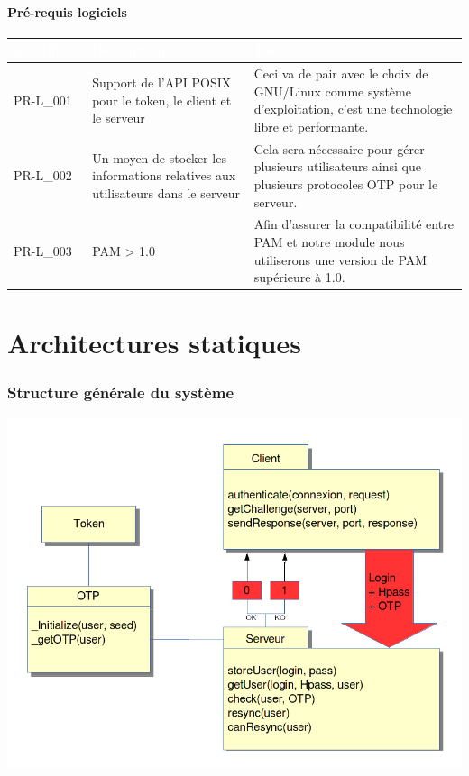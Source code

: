 \documentclass{"../../res/univ-projet"}
\begin{document}
\subsection{Pré-requis logiciels}
\begin{tabular}{|p{}|p{}|p{}|}
    \hline
    \rowcolor{gray}
    \textcolor{white}{\bfseries Identifiant} & 
    \textcolor{white}{\bfseries Description} &
    \textcolor{white}{\bfseries Justification} \\
    \hline
    PR-L\_001 &
    Support de l'API POSIX pour le token, le client et le serveur &
    Ceci va de pair avec le choix de GNU/Linux comme système d'exploitation,
    c'est une technologie libre et performante.\\
    \hline
    PR-L\_002 &
    Un moyen de stocker les informations relatives aux utilisateurs dans le serveur&
    Cela sera nécessaire pour gérer plusieurs utilisateurs ainsi que plusieurs protocoles
    OTP pour le serveur.\\
    \hline
    PR-L\_003 &
    PAM > 1.0 &
    Afin d'assurer la compatibilité entre PAM et notre module nous utiliserons
    une version de PAM supérieure à 1.0.\\
    \hline
\end{tabular}


\part*{Architectures statiques}
\section{Structure générale du système}
\includegraphics[width=\textwidth]{../graphics/architecture.png}
\end{document}
